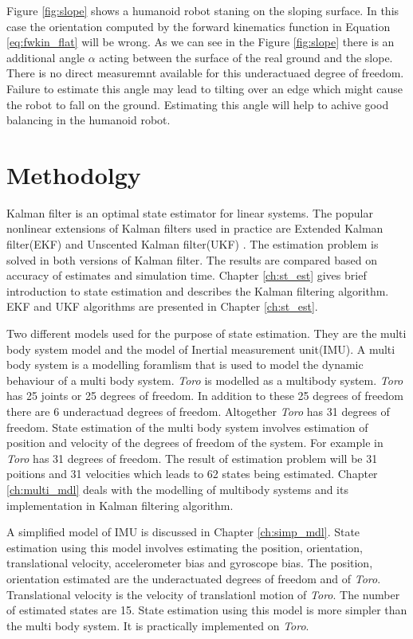     Figure \ref{fig:slope} shows a humanoid robot staning on the sloping surface. In this case the orientation computed by the forward kinematics function in Equation \ref{eq:fwkin_flat} will be wrong. As we can see in the Figure \ref{fig:slope} there is an additional angle $\alpha$ acting between the surface of the real ground and the slope. There is no direct measuremnt available for this underactuaed degree of freedom. Failure to estimate this angle may lead to  tilting over an edge which might cause the robot to fall on the ground. Estimating this angle will help to achive good balancing in the humanoid robot.

 \section{Methodolgy} 
    Kalman filter is an optimal state estimator for linear systems. The popular nonlinear extensions of Kalman filters used in practice are Extended Kalman filter(EKF) and Unscented Kalman filter(UKF) \citep{oli12}\citep{atk12}\citep{bloe12}. The estimation problem is solved in both versions of Kalman filter. The results are compared based on accuracy of estimates and simulation time. Chapter \ref{ch:st_est} gives brief introduction to state estimation and describes the Kalman filtering algorithm. EKF and UKF algorithms are presented in Chapter \ref{ch:st_est}.

    Two different models used for the purpose of state estimation. They are the multi body system model and the model of Inertial measurement unit(IMU). A multi body system is a modelling foramlism that is used to model the dynamic behaviour of a multi body system. \emph{Toro} is modelled as a multibody system. \emph{Toro} has 25 joints or 25 degrees of freedom. In addition to these 25 degrees of freedom there are 6 underactuad degrees of freedom. Altogether \emph{Toro} has 31 degrees of freedom. State estimation of the multi body system involves estimation of position and velocity of the degrees of freedom of the system. For example in \emph{Toro} has 31 degrees of freedom. The result of estimation problem will be 31 poitions and 31 velocities which leads to 62 states being estimated. Chapter \ref{ch:multi_mdl} deals with the modelling of multibody systems and its implementation in Kalman filtering algorithm. 
    
    A simplified model of IMU is discussed in Chapter \ref{ch:simp_mdl}. State estimation using this model involves estimating the position, orientation, translational velocity, accelerometer bias and gyroscope bias. The position, orientation estimated are the underactuated degrees of freedom and of \emph{Toro}. Translational velocity is the velocity of translationl motion of \emph{Toro}. The number of estimated states are 15. State estimation using this model is more simpler than the multi body system. It is practically implemented on \emph{Toro}.
